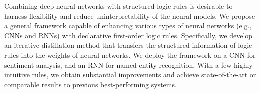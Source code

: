 Combining deep neural networks with structured logic rules is desirable to harness flexibility and reduce uninterpretability of the neural models. We propose a general framework capable of enhancing various types of neural networks (e.g., CNNs and RNNs) with declarative first-order logic rules. Specifically, we develop an iterative distillation method that transfers the structured information of logic rules into the weights of neural networks. We deploy the framework on a CNN for sentiment analysis, and an RNN for named entity recognition. With a few highly intuitive rules, we obtain substantial improvements and achieve state-of-the-art or comparable results to previous best-performing systems.
